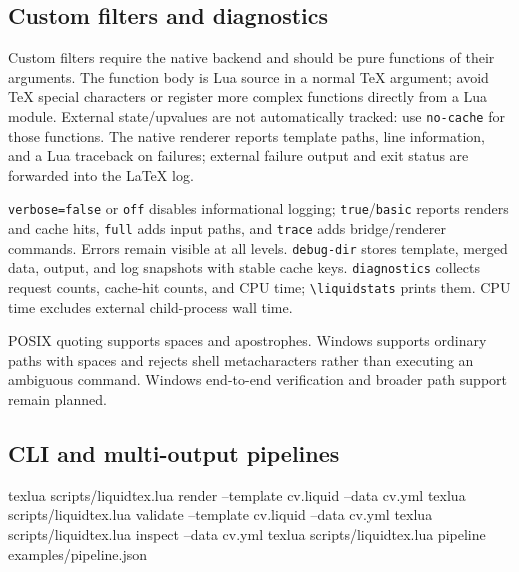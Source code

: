 \subsection{Custom filters and diagnostics}

\begin{preamblecode}
\end{preamblecode}

Custom filters require the native backend and should be pure functions of their
arguments. The function body is Lua source in a normal TeX argument; avoid TeX
special characters or register more complex functions directly from a Lua module.
External state/upvalues are not automatically tracked: use \texttt{no-cache} for
those functions. The native renderer reports template paths, line information,
and a Lua traceback on failures; external failure output and exit status are
forwarded into the LaTeX log.

\texttt{verbose=false} or \texttt{off} disables informational logging;
\texttt{true}/\texttt{basic} reports renders and cache hits, \texttt{full} adds input
paths, and \texttt{trace} adds bridge/renderer commands. Errors remain visible at
all levels. \texttt{debug-dir} stores template, merged data, output, and log
snapshots with stable cache keys. \texttt{diagnostics} collects request counts,
cache-hit counts, and CPU time; \verb|\liquidstats| prints them. CPU time excludes
external child-process wall time.

POSIX quoting supports spaces and apostrophes. Windows supports ordinary paths
with spaces and rejects shell metacharacters rather than executing an ambiguous
command. Windows end-to-end verification and broader path support remain planned.

\subsection{CLI and multi-output pipelines}

\begin{terminalblock}
texlua scripts/liquidtex.lua render --template cv.liquid --data cv.yml
texlua scripts/liquidtex.lua validate --template cv.liquid --data cv.yml
texlua scripts/liquidtex.lua inspect --data cv.yml
texlua scripts/liquidtex.lua pipeline examples/pipeline.json
\end{terminalblock}

